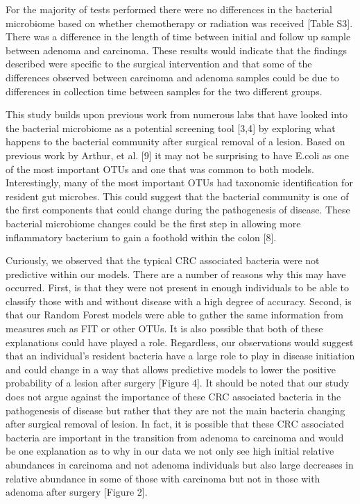\documentclass[12pt,]{article}
\begin{document}
For the majority of tests performed there were no differences in the
bacterial microbiome based on whether chemotherapy or radiation was
received {[}Table S3{]}. There was a difference in the length of time
between initial and follow up sample between adenoma and carcinoma.
These results would indicate that the findings described were specific
to the surgical intervention and that some of the differences observed
between carcinoma and adenoma samples could be due to differences in
collection time between samples for the two different groups.

This study builds upon previous work from numerous labs that have looked
into the bacterial microbiome as a potential screening tool {[}3,4{]} by
exploring what happens to the bacterial community after surgical removal
of a lesion. Based on previous work by Arthur, et al. {[}9{]} it may not
be surprising to have E.coli as one of the most important OTUs and one
that was common to both models. Interestingly, many of the most
important OTUs had taxonomic identification for resident gut microbes.
This could suggest that the bacterial community is one of the first
components that could change during the pathogenesis of disease. These
bacterial microbiome changes could be the first step in allowing more
inflammatory bacterium to gain a foothold within the colon {[}8{]}.

Curiously, we observed that the typical CRC associated bacteria were not
predictive within our models. There are a number of reasons why this may
have occurred. First, is that they were not present in enough
individuals to be able to classify those with and without disease with a
high degree of accuracy. Second, is that our Random Forest models were
able to gather the same information from measures such as FIT or other
OTUs. It is also possible that both of these explanations could have
played a role. Regardless, our observations would suggest that an
individual's resident bacteria have a large role to play in disease
initiation and could change in a way that allows predictive models to
lower the positive probability of a lesion after surgery {[}Figure 4{]}.
It should be noted that our study does not argue against the importance
of these CRC associated bacteria in the pathogenesis of disease but
rather that they are not the main bacteria changing after surgical
removal of lesion. In fact, it is possible that these CRC associated
bacteria are important in the transition from adenoma to carcinoma and
would be one explanation as to why in our data we not only see high
initial relative abundances in carcinoma and not adenoma individuals but
also large decreases in relative abundance in some of those with
carcinoma but not in those with adenoma after surgery {[}Figure 2{]}.
\end{document}
